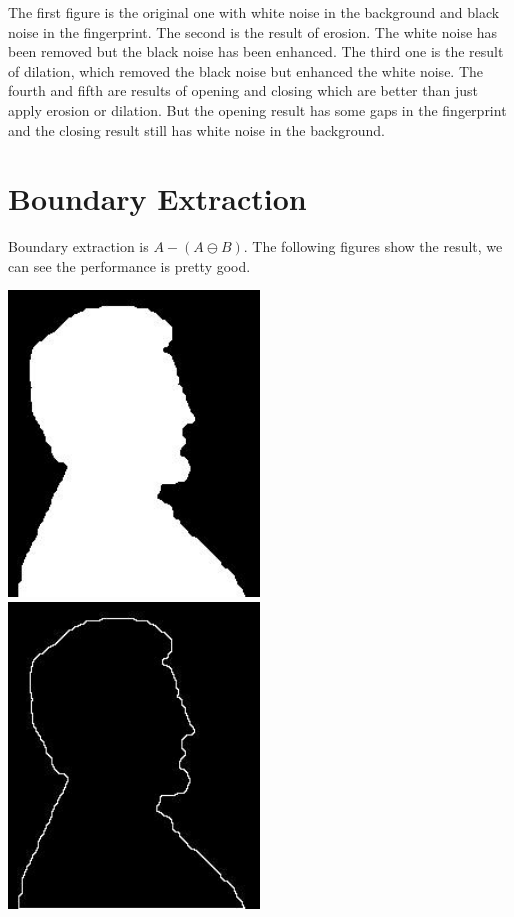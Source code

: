 \documentclass{article}
\begin{document}
The first figure is the original one with white noise in the background and black noise in the fingerprint. The second is the result of erosion. The white noise has been removed but the black noise has been enhanced. The third one is the result of dilation, which removed the black noise but enhanced the white noise. The fourth and fifth are results of opening and closing which are better than just apply erosion or dilation. But the opening result has some gaps in the fingerprint and the closing result still has white noise in the background. 

\section{Boundary Extraction}
Boundary extraction is $A-(A\ominus B)$. The following figures show the result, we can see the performance is pretty good.

\includegraphics[width=0.5\textwidth]{../data/licoln_from_penny.jpg}
\includegraphics[width=0.5\textwidth]{../data/boundary_extraction_licoln_from_penny.jpg}
\end{document}
